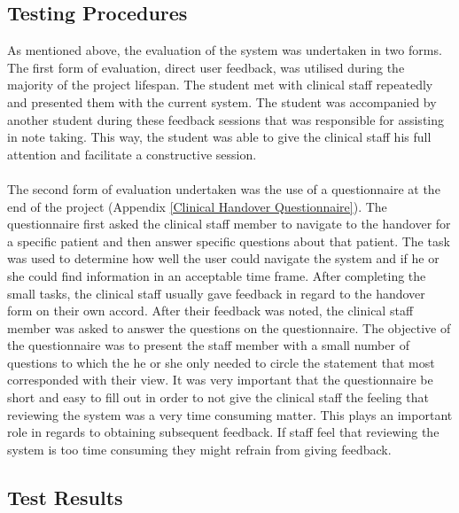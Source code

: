 \subsection{Testing Procedures}
As mentioned above, the evaluation of the system was undertaken in two forms. The first form of evaluation, direct user feedback, was utilised during the majority of the project lifespan. The student met with clinical staff repeatedly and presented them with the current system. The student was accompanied by another student during these feedback sessions that was responsible for assisting in note taking. This way, the student was able to give the clinical staff his full attention and facilitate a constructive session. 
\\ \\
The second form of evaluation undertaken was the use of a questionnaire at the end of the project (Appendix \ref{Clinical Handover Questionnaire}). The questionnaire first asked the clinical staff member to navigate to the handover for a specific patient and then answer specific questions about that patient. The task was used to determine how well the user could navigate the system and if he or she could find information in an acceptable time frame. After completing the small tasks, the clinical staff usually gave feedback in regard to the handover form on their own accord. After their feedback was noted, the clinical staff member was asked to answer the questions on the questionnaire. The objective of the questionnaire was to present the staff member with a small number of questions to which the he or she only needed to circle the statement that most corresponded with their view. It was very important that the questionnaire be short and easy to fill out in order to not give the clinical staff the feeling that reviewing the system was a very time consuming matter. This plays an important role in regards to obtaining subsequent feedback. If staff feel that reviewing the system is too time consuming they might refrain from giving feedback.

\subsection{Test Results}

